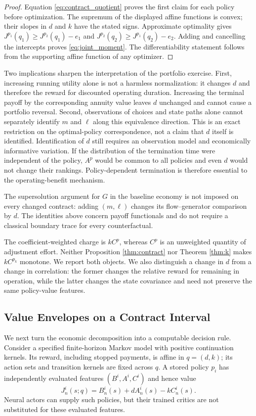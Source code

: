 \begin{proof}
Equation \eqref{eq:contract_quotient} proves the first claim for each policy before optimization. The supremum of the displayed affine functions is convex; their slopes in $d$ and $k$ have the stated signs. Approximate optimality gives $J^{p_1}(q_1)\geq J^{p_2}(q_1)-e_1$ and $J^{p_2}(q_2)\geq J^{p_1}(q_2)-e_2$. Adding and cancelling the intercepts proves \eqref{eq:joint_moment}. The differentiability statement follows from the supporting affine function of any optimizer.
\end{proof}

Two implications sharpen the interpretation of the portfolio exercise. First, increasing running utility alone is not a harmless normalization: it changes $d$ and therefore the reward for discounted operating duration. Increasing the terminal payoff by the corresponding annuity value leaves $d$ unchanged and cannot cause a portfolio reversal. Second, observations of choices and state paths alone cannot separately identify $m$ and $\ell$ along this equivalence direction. This is an exact restriction on the optimal-policy correspondence, not a claim that $d$ itself is identified. Identification of $d$ still requires an observation model and economically informative variation. If the distribution of the termination time were independent of the policy, $A^p$ would be common to all policies and even $d$ would not change their rankings. Policy-dependent termination is therefore essential to the operating-benefit mechanism.

The supersolution argument for $G$ in the baseline economy is not imposed on every changed contract: adding $(m,\ell)$ changes its flow--generator comparison by $d$. The identities above concern payoff functionals and do not require a classical boundary trace for every counterfactual.

The coefficient-weighted charge is $kC^p$, whereas $C^p$ is an unweighted quantity of adjustment effort. Neither Proposition \ref{thm:contract} nor Theorem \ref{thm:k} makes $kC^{p_k}$ monotone. We report both objects. We also distinguish a change in $d$ from a change in correlation: the former changes the relative reward for remaining in operation, while the latter changes the state covariance and need not preserve the same policy-value features.

\subsection{Value Envelopes on a Contract Interval}
We next turn the economic decomposition into a computable decision rule. Consider a specified finite-horizon Markov model with positive continuation kernels. Its reward, including stopped payments, is affine in $q=(d,k)$; its action sets and transition kernels are fixed across $q$. A stored policy $p_i$ has independently evaluated features $(B^i,A^i,C^i)$ and hence value
\begin{equation}
 J^i_n(s;q)=B^i_n(s)+dA^i_n(s)-kC^i_n(s).
 \label{eq:library_value}
\end{equation}
Neural actors can supply such policies, but their trained critics are not substituted for these evaluated features.

